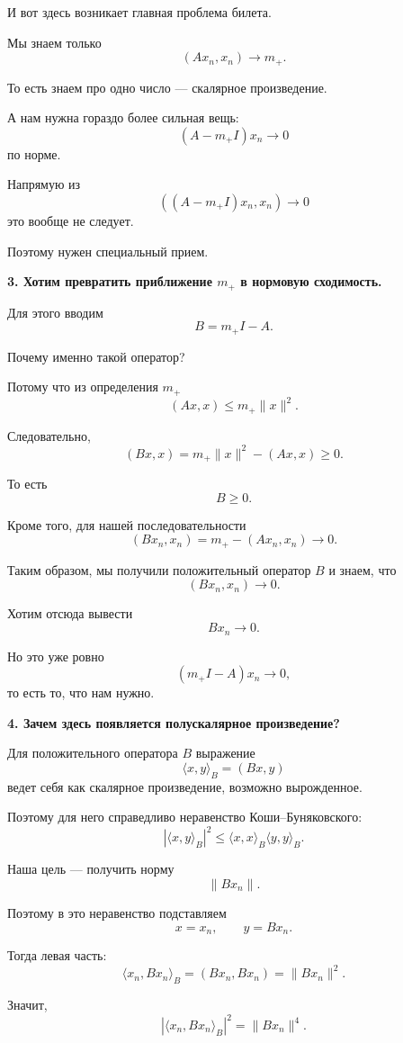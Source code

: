 \begin{idea}
	И вот здесь возникает главная проблема билета.
	
	Мы знаем только
	\[
	(Ax_n,x_n)\to m_+.
	\]
	
	То есть знаем про одно число --- скалярное произведение.
	
	А нам нужна гораздо более сильная вещь:
	\[
	(A-m_+I)x_n\to0
	\]
	по норме.
	
	Напрямую из
	\[
	((A-m_+I)x_n,x_n)\to0
	\]
	это вообще не следует.
	
	Поэтому нужен специальный прием.
	
	\medskip
	
	\textbf{3. Хотим превратить приближение \(m_+\) в нормовую сходимость.}
	
	Для этого вводим
	\[
	B=m_+I-A.
	\]
	
	Почему именно такой оператор?
	
	Потому что из определения \(m_+\)
	\[
	(Ax,x)\leq m_+\|x\|^2.
	\]
	
	Следовательно,
	\[
	(Bx,x)
	=
	m_+\|x\|^2-(Ax,x)
	\geq0.
	\]
	
	То есть
	\[
	\boxed{B\geq0.}
	\]
	
	Кроме того, для нашей последовательности
	\[
	(Bx_n,x_n)
	=
	m_+-(Ax_n,x_n)
	\to0.
	\]
	
	Таким образом, мы получили положительный оператор \(B\) и знаем, что
	\[
	(Bx_n,x_n)\to0.
	\]
	
	Хотим отсюда вывести
	\[
	Bx_n\to0.
	\]
	
	Но это уже ровно
	\[
	(m_+I-A)x_n\to0,
	\]
	то есть то, что нам нужно.
	
	\medskip
	
	\textbf{4. Зачем здесь появляется полускалярное произведение?}
	
	Для положительного оператора \(B\) выражение
	\[
	\langle x,y\rangle_B=(Bx,y)
	\]
	ведет себя как скалярное произведение, возможно вырожденное.
	
	Поэтому для него справедливо неравенство Коши--Буняковского:
	\[
	|\langle x,y\rangle_B|^2
	\leq
	\langle x,x\rangle_B
	\langle y,y\rangle_B.
	\]
	
	Наша цель --- получить норму
	\[
	\|Bx_n\|.
	\]
	
	Поэтому в это неравенство подставляем
	\[
	x=x_n,
	\qquad
	y=Bx_n.
	\]
	
	Тогда левая часть:
	\[
	\langle x_n,Bx_n\rangle_B
	=
	(Bx_n,Bx_n)
	=
	\|Bx_n\|^2.
	\]
	
	Значит,
	\[
	|\langle x_n,Bx_n\rangle_B|^2
	=
	\|Bx_n\|^4.
	\]
	

\end{idea}
